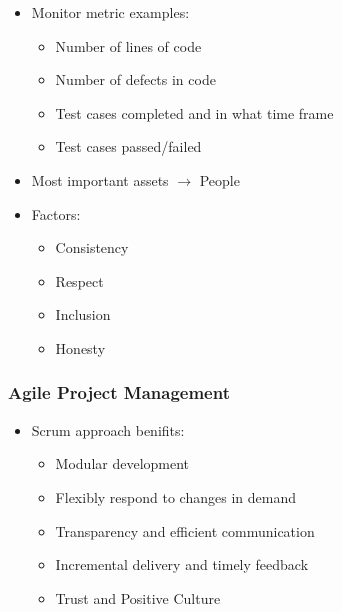 \documentclass[12pt,openany]{book}
\begin{document}
\begin{itemize}
    \item Monitor metric examples:
    \begin{itemize}
        \item Number of lines of code
        \item Number of defects in code
        \item Test cases completed and in what time frame
        \item Test cases passed/failed
    \end{itemize}
    \item Most important assets $\rightarrow$ People
    \item Factors:
    \begin{itemize}
        \item Consistency
        \item Respect
        \item Inclusion
        \item Honesty
    \end{itemize}
\end{itemize}

\subsubsection{Agile Project Management}
\begin{itemize}
    \item Scrum approach benifits:
    \begin{itemize}
        \item Modular development
        \item Flexibly respond to changes in demand
        \item Transparency and efficient communication
        \item Incremental delivery and timely feedback
        \item Trust and Positive Culture
    \end{itemize}
\end{itemize}
\end{document}
